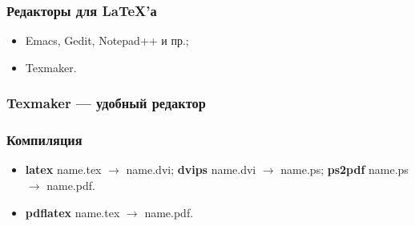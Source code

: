 \documentclass{beamer}
\begin{document}
\begin{frame}
  \frametitle{Редакторы для \LaTeX 'а}
  \begin{itemize}
    \item Emacs, Gedit, Notepad++ и пр.;
    \item Texmaker.
  \end{itemize} 
\end{frame}
  
\begin{frame}
  \frametitle{Texmaker — удобный редактор}
  \begin{figure}[h!]
  \end{figure}
\end{frame}

\begin{frame}
  \frametitle{Компиляция}
  \begin{itemize}
    \item \textbf{latex} name.tex $\rightarrow$ name.dvi; \textbf{dvips} name.dvi $\rightarrow$ name.ps; \textbf{ps2pdf} name.ps $\rightarrow$ name.pdf.
    \item \textbf{pdflatex} name.tex $\rightarrow$ name.pdf.
  \end{itemize}   
\end{frame}
\end{document}
